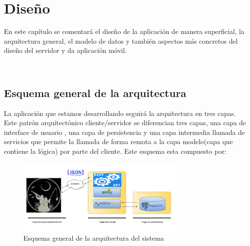 \newpage
\chapter{Diseño}
\label{s:dev:arch}
 

En este capítulo se comentará el diseño de la aplicación de manera superficial, la arquitectura general, el
modelo de datos y también aspectos más concretos del diseño del servidor y da aplicación
móvil.

\

\section{Esquema general de la arquitectura}
La aplicación que estamos desarrollando seguirá la arquitectura
en tres capas. Este patrón arquitectónico cliente/servidor se diferencian tres
capas, una capa de interface de usuario , una capa de persistencia
y una capa intermedia llamada de servicios que permite la llamada de forma remota a la capa modelo(capa que contiene la lógica) por parte del cliente. Este esquema esta compuesto por:




\begin{figure}[H]
		\centering
		\includegraphics[width=0.75\textwidth] {arquitectura.png}
		\caption{Esquema general de la arquitectura del sistema }
	\end{figure}


